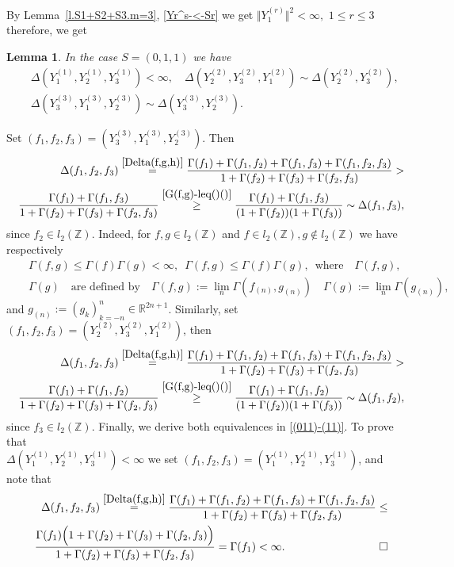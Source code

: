 \documentclass[preprint,12pt]{elsarticle}
\newtheorem{lem}[thm]{Lemma}
\numberwithin{equation}{section}
\begin{document}
By Lemma~\ref{l.S1+S2+S3.m=3}, \eqref{Yr^s-<-Sr} we get $\Vert Y_1^{(r)}\Vert^2<\infty,\,\,1\leq r\leq 3$ therefore,
we get
\begin{lem}
\label{l.S=(0,1,1)} 
In the case  $S=(0,1,1)$ we have 
%
\begin{eqnarray}
\nonumber
&&\Delta(Y_1^{(1)},Y_2^{(1)},Y_3^{(1)})<\infty,
\quad
\Delta(Y_2^{(2)},Y_3^{(2)},Y_1^{(2)})\sim  \Delta(Y_2^{(2)},Y_3^{(2)}),\\
\label{(011)-(11)}
&&\Delta(Y_3^{(3)}, Y_1^{(3)},Y_2^{(3)})\sim \Delta(Y_3^{(3)},Y_2^{(3)}).
\end{eqnarray}
\end{lem}
%
\begin{pf} 
Set $(f_1,f_2,f_3)=(Y_3^{(3)}, Y_1^{(3)},Y_2^{(3)})$. Then
\begin{eqnarray*}
&&\Delta(f_1,f_2,f_3)\overset{\eqref{Delta(f,g,h)}}{=}
\frac{\Gamma(f_1)+\Gamma(f_1,f_2)+\Gamma(f_1,f_3)+\Gamma(f_1,f_2,f_3)}{1+\Gamma(f_2)+\Gamma(f_3)+\Gamma(f_2,f_3)}>\\
&&
\frac{\Gamma(f_1)+\Gamma(f_1,f_3)}{1+\Gamma(f_2)+\Gamma(f_3)+\Gamma(f_2,f_3)}\stackrel{\eqref{G(f,g)-leq()()}}{\geq}
\frac{\Gamma(f_1)+\Gamma(f_1,f_3)}{(1+\Gamma(f_2))(1+\Gamma(f_3))}\sim  \Delta(f_1,f_3),
\end{eqnarray*} 
since $f_2\!\in\! l_2(\mathbb Z)$.  Indeed, for $f,g\!\in\! l_2(\mathbb Z)$ and  $f\!\in\! l_2(\mathbb Z), g\!\not\in\! l_2(\mathbb Z)$ we have respectively 
\begin{eqnarray}
\label{G(f,g)-leq()()}
&&
\Gamma(f,g)\leq \Gamma(f)\Gamma(g)<\infty,\,\,\,
\Gamma(f,g)\leq \Gamma(f)\Gamma(g),\,\,\,\text{where}\quad\Gamma(f,g),
\\
\nonumber
&&
\Gamma(g)\quad \text{are defined by}\quad \Gamma(f,g):=\lim_n \Gamma(f_{(n)},g_{(n)})\quad\Gamma(g):=\lim_n\Gamma(g_{(n)}),
\end{eqnarray}
and $g_{(n)}\!:=\!(g_k)_{k=-n}^n\!\in\!\mathbb R^{2n+1}$. 
Similarly, set $(f_1,f_2,f_3)\!=\!(Y_2^{(2)},Y_3^{(2)},Y_1^{(2)})$,
then
\begin{eqnarray*}
&&\Delta(f_1,f_2,f_3)\overset{\eqref{Delta(f,g,h)}}{=}
\frac{\Gamma(f_1)+\Gamma(f_1,f_2)+\Gamma(f_1,f_3)+\Gamma(f_1,f_2,f_3)}{1+\Gamma(f_2)+\Gamma(f_3)+\Gamma(f_2,f_3)}>\\
&&
\frac{\Gamma(f_1)+\Gamma(f_1,f_2)}{1+\Gamma(f_2)+\Gamma(f_3)+\Gamma(f_2,f_3)}\stackrel{\eqref{G(f,g)-leq()()}}{\geq}
\frac{\Gamma(f_1)+\Gamma(f_1,f_2)}{(1+\Gamma(f_2))(1+\Gamma(f_3))}
\sim  \Delta(f_1,f_2),
\end{eqnarray*}
since $f_3\in  l_2(\mathbb Z)$.
%
%
%
Finally, we  
derive both equivalences
in \eqref{(011)-(11)}.
To prove that \\$\Delta(Y_1^{(1)},Y_2^{(1)},Y_3^{(1)})<\infty$ we set $(f_1,f_2,f_3)=( Y_1^{(1)},Y_2^{(1)},Y_3^{(1)})$, and note that
\begin{eqnarray*}
&&\Delta(f_1,f_2,f_3)\overset{\eqref{Delta(f,g,h)}}{=}
\frac{\Gamma(f_1)+\Gamma(f_1,f_2)+\Gamma(f_1,f_3)+\Gamma(f_1,f_2,f_3)}{1+\Gamma(f_2)+\Gamma(f_3)+\Gamma(f_2,f_3)}\leq \\
&&\frac{\Gamma(f_1)\Big(1+\Gamma(f_2)+\Gamma(f_3)+\Gamma(f_2,f_3)\Big)}
{1+\Gamma(f_2)+\Gamma(f_3)+\Gamma(f_2,f_3)}=\Gamma(f_1)<\infty.
%
\hskip 3cm \Box
\end{eqnarray*}
\end{pf} 
\end{document}
